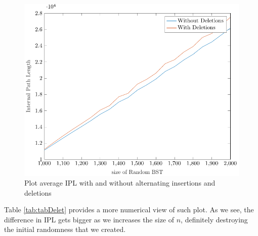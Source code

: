 \begin{figure}[ht]
    \centering
    \includegraphics[scale=0.65]{plotDeletion.pdf}
    \caption{Plot average IPL with and without alternating insertions and deletions}
    \label{fig:plotDeletion}
\end{figure}

\newpage

Table \ref{tab:tabDelet} provides a more numerical view of such plot. As we see, the difference in IPL gets bigger as we increases the size of $n$, definitely destroying the initial randomness that we created.


